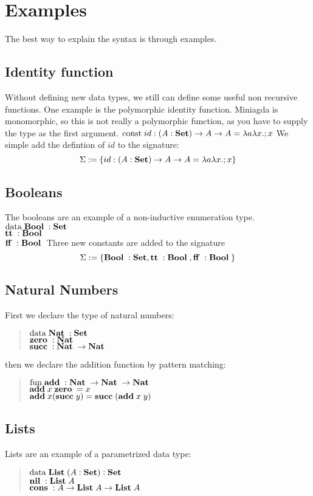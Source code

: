 \section{Examples}
The best way to explain the syntax is through examples.
\subsection{Identity function}
Without defining new data types, we still can define some useful non recursive functions.
One example is the polymorphic identity function. 
Miniagda is monomorphic, so this is not really a polymorphic function, as you have to supply the
type as the first argument.
$\mathrm{const}\; id : ( A : \mathbf{Set} ) \rightarrow A \rightarrow A = \lambda a \lambda x . ; x$   
We simple add the defintion of $id$ to the signature:
\[ \Sigma := \{ id : ( A : \mathbf{Set} ) \rightarrow A \rightarrow A = \lambda a \lambda x . ; x \} \]
\subsection{Booleans}
The booleans are an example of a non-inductive enumeration type.
$\mathrm{data}\; \mathbf{Bool}\; : \mathbf{Set}$ 
\\
$\mathbf{tt}\; : \mathbf{Bool}\; $
\\
$\mathbf{ff}\; : \mathbf{Bool}\; $
Three new constants are added to the signature
\[ \Sigma := \{ \mathbf{Bool}\; : \mathbf{Set} , \mathbf{tt}\; : \mathbf{Bool}\; , \mathbf{ff}\; : \mathbf{Bool}\; \} \]
\subsection{Natural Numbers}
First we declare the type of natural numbers:
\begin{quote}
$\mathrm{data}\; \mathbf{Nat}\; : \mathbf{Set}$ 
\\
$\mathbf{zero}\; : \mathbf{Nat}\; $
\\
$\mathbf{succ}\; : \mathbf{Nat}\; \rightarrow \mathbf{Nat}\; $
\end{quote}
then we declare the addition function by pattern matching:
\begin{quote}
$\mathrm{fun}\; \mathbf{add}\; : \mathbf{Nat}\; \rightarrow \mathbf{Nat}\; \rightarrow \mathbf{Nat}\;$
\\
$\mathbf{add}\; x \; \mathbf{zero}\; = x $
\\
$\mathbf{add}\; x (\mathbf{succ}\; y) = \mathbf{succ}\; ( \mathbf{add}\; x \; y)  $
\end{quote}
\subsection{Lists}
Lists are an example of a parametrized data type:
\begin{quote}
$\mathrm{data}\; \mathbf{List}\; ( A : \mathbf{Set} ) : \mathbf{Set} $ 
\\
$\mathbf{nil}\; : \mathbf{List}\; A  $
\\
$\mathbf{cons}\; : A \rightarrow \mathbf{List}\; A \rightarrow \mathbf{List}\; A $
\end{quote}
